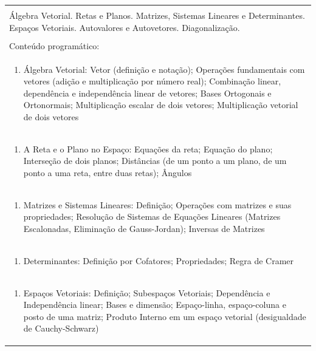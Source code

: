 \documentclass[11pt]{article}
\begin{document}
\begin{center}
\begin{longtable}{|p{4cm}|p{4cm}|p{4cm}|p{4cm}|}
\multicolumn{4}{|p{16cm}|}{}\\
\multicolumn{4}{|p{\dimexpr 16cm + 6\tabcolsep\relax}|}{Álgebra Vetorial. Retas e Planos. Matrizes, Sistemas Lineares e Determinantes. Espaços Vetoriais. Autovalores e Autovetores. Diagonalização.}\\
\multicolumn{4}{|p{16cm}|}{}\\
\hline
\multicolumn{4}{|p{16cm}|}{Conteúdo programático:}\\*
\multicolumn{4}{|p{\dimexpr 16cm + 6\tabcolsep\relax}|}{\begin{enumerate}[start=1]\item Álgebra Vetorial: Vetor (definição e notação); Operações fundamentais com vetores (adição e multiplicação por número real); Combinação linear, dependência e independência linear de vetores; Bases Ortogonais e Ortonormais; Multiplicação escalar de dois vetores; Multiplicação vetorial de dois vetores\end{enumerate}}\\
\multicolumn{4}{|p{\dimexpr 16cm + 6\tabcolsep\relax}|}{\begin{enumerate}[start=2]\item A Reta e o Plano no Espaço: Equações da reta; Equação do plano; Interseção de dois planos; Distâncias (de um ponto a um plano, de um ponto a uma reta, entre duas retas); Ângulos\end{enumerate}}\\
\multicolumn{4}{|p{\dimexpr 16cm + 6\tabcolsep\relax}|}{\begin{enumerate}[start=3]\item Matrizes e Sistemas Lineares: Definição; Operações com matrizes e suas propriedades; Resolução de Sistemas de Equações Lineares (Matrizes Escalonadas, Eliminação de Gauss-Jordan); Inversas de Matrizes\end{enumerate}}\\
\multicolumn{4}{|p{\dimexpr 16cm + 6\tabcolsep\relax}|}{\begin{enumerate}[start=4]\item Determinantes: Definição por Cofatores; Propriedades; Regra de Cramer\end{enumerate}}\\
\multicolumn{4}{|p{\dimexpr 16cm + 6\tabcolsep\relax}|}{\begin{enumerate}[start=5]\item Espaços Vetoriais: Definição; Subespaços Vetoriais; Dependência e Independência linear; Bases e dimensão; Espaço-linha, espaço-coluna e posto de uma matriz; Produto Interno em um espaço vetorial (desigualdade de Cauchy-Schwarz)\end{enumerate}}\\

\end{longtable}
\end{center}
\end{document}

